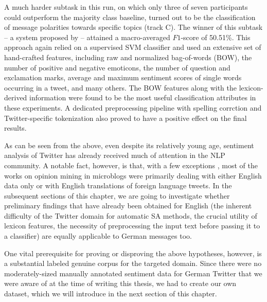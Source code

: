 A much harder subtask in this run, on which only three of seven
participants could outperform the majority class baseline, turned out
to be the classification of message polarities towards specific topics
(track C).  The winner of this subtask -- a system proposed by
\citet{Boag:15} -- attained a macro-averaged $F1$-score of 50.51\%.
This approach again relied on a supervised SVM classifier and used an
extensive set of hand-crafted features, including raw and normalized
bag-of-words (BOW), the number of positive and negative emoticons, the
number of question and exclamation marks, average and maximum
sentiment scores of single words occurring in a tweet, and many
others.  The BOW features along with the lexicon-derived information
were found to be the most useful classification attributes in these
experiments.  A dedicated preprocessing pipeline with spelling
corrction and Twitter-specific tokenization also proved to have a
positive effect on the final results.

As can be seen from the above, even despite its relatively young age,
sentiment analysis of Twitter has already received much of attention
in the NLP community.  A notable fact, however, is that, with a few
exceptions \cite{Basile:13,Araque:15,Cesteros:15}, most of the works
on opinion mining in microblogs were primarily dealing with either
English data only or with English translations of foreign language
tweets.  In the subsequent sections of this chapter, we are going to
investigate whether preliminary findings that have already been
obtained for English (the inherent difficulty of the Twitter domain
for automatic SA methods, the crucial utility of lexicon features, the
necessity of preprocessing the input text before passing it to a
classifier) are equally applicable to German messages too.

One vital prerequisite for proving or disproving the above hypotheses,
however, is a substantial labeled genuine corpus for the targeted
domain.  Since there were no moderately-sized manually annotated
sentiment data for German Twitter that we were aware of at the time of
writing this thesis, we had to create our own dataset, which we will
introduce in the next section of this chapter.


